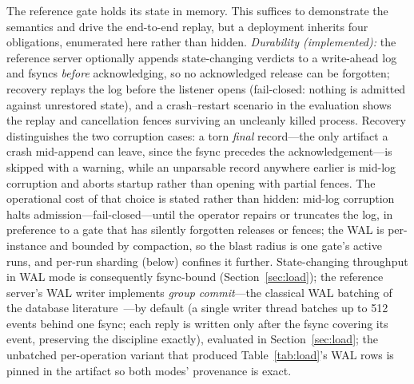 \documentclass[10pt,journal,compsoc]{IEEEtran}
\begin{document}
\medskip
\noindent The reference gate holds its state in memory. This suffices to
demonstrate the semantics and drive the end-to-end replay, but a deployment
inherits four obligations, enumerated here rather than hidden. \emph{Durability
(implemented):} the reference server optionally appends state-changing
verdicts to a write-ahead log and fsyncs \emph{before} acknowledging, so no
acknowledged release can be forgotten; recovery replays the log before the
listener opens (fail-closed: nothing is admitted against unrestored state),
and a crash--restart scenario in the evaluation shows the replay and
cancellation fences surviving an uncleanly killed process. Recovery
distinguishes the two corruption cases: a torn \emph{final} record---the only
artifact a crash mid-append can leave, since the fsync precedes the
acknowledgement---is skipped with a warning, while an unparsable record
anywhere earlier is mid-log corruption and aborts startup rather than opening
with partial fences. The operational cost of that choice is stated rather
than hidden: mid-log corruption halts admission---fail-closed---until the
operator repairs or truncates the log, in preference to a gate that has
silently forgotten releases or fences; the WAL is per-instance and bounded
by compaction, so the blast radius is one gate's active runs, and per-run
sharding (below) confines it further. State-changing throughput in WAL mode is consequently
fsync-bound (Section~\ref{sec:load}); the reference server's WAL writer implements \emph{group
commit}---the classical WAL batching of the database
literature~\cite{dewitt84}---by default (a single writer thread batches up to 512
events behind one fsync; each reply is written only after the fsync covering
its event, preserving the discipline exactly), evaluated in
Section~\ref{sec:load}; the unbatched per-operation variant that produced
Table~\ref{tab:load}'s WAL rows is pinned in the artifact so both modes'
provenance is exact.
\end{document}
